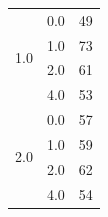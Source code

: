 \begin{longtable}{|c|c|c|c|c|}
\hline
\multirow{4}{*}{1.0} & \multicolumn{2}{c|}{0.0} & \multicolumn{2}{c|}{49} \\
& \multicolumn{2}{c|}{1.0} & \multicolumn{2}{c|}{73} \\
& \multicolumn{2}{c|}{2.0} & \multicolumn{2}{c|}{61} \\
& \multicolumn{2}{c|}{4.0} & \multicolumn{2}{c|}{53} \\
\hline
\multirow{4}{*}{2.0} & \multicolumn{2}{c|}{0.0} & \multicolumn{2}{c|}{57} \\
& \multicolumn{2}{c|}{1.0} & \multicolumn{2}{c|}{59} \\
& \multicolumn{2}{c|}{2.0} & \multicolumn{2}{c|}{62} \\
& \multicolumn{2}{c|}{4.0} & \multicolumn{2}{c|}{54} \\
\hline
\end{longtable}


